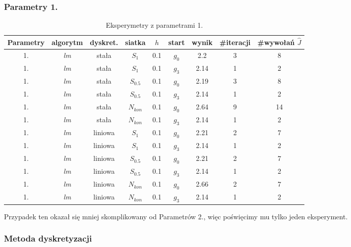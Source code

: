 \documentclass[11pt]{article}
\begin{document}
\subsubsection{Parametry 1.}
\begin{table}[h]
  \begin{center}
    \begin{tabular}{|c|c|c|c|c|c|c|c|c|}
      \hline
      Parametry & algorytm & dyskret. & siatka & $h$ & start & wynik & \#iteracji & \#wywołań $\hat{J}$ \\
      \hline
      1. & {\it lm\/} & stała & $S_1$ & 0.1 & $g_0$ & 2.2 & 3 & 8 \\
      \hline
      1. & {\it lm\/} & stała & $S_1$ & 0.1 & $g_3$ & 2.14 & 1 & 2 \\
      \hline
      1. & {\it lm\/} & stała & $S_{0.5}$ & 0.1 & $g_0$ & 2.19 & 3 & 8 \\
      \hline
      1. & {\it lm\/} & stała & $S_{0.5}$ & 0.1 & $g_3$ & 2.14 & 1 & 2 \\
      \hline
      1. & {\it lm\/} & stała & $N_{kon}$ & 0.1 & $g_0$ & 2.64 & 9 & 14 \\
      \hline
      1. & {\it lm\/} & stała & $N_{kon}$ & 0.1 & $g_3$ & 2.14 & 1 & 2 \\
      \hline
      1. & {\it lm\/} & liniowa & $S_1$ & 0.1 & $g_0$ & 2.21 & 2 & 7 \\
      \hline
      1. & {\it lm\/} & liniowa & $S_1$ & 0.1 & $g_3$ & 2.14 & 1 & 2 \\
      \hline
      1. & {\it lm\/} & liniowa & $S_{0.5}$ & 0.1 & $g_0$ & 2.21 & 2 & 7 \\
      \hline
      1. & {\it lm\/} & liniowa & $S_{0.5}$ & 0.1 & $g_3$ & 2.14 & 1 & 2 \\
      \hline
      1. & {\it lm\/} & liniowa & $N_{kon}$ & 0.1 & $g_0$ & 2.66 & 2 & 7 \\
      \hline
      1. & {\it lm\/} & liniowa & $N_{kon}$ & 0.1 & $g_3$ & 2.14 & 1 & 2 \\
      \hline
    \end{tabular}
    \caption{Eksperymetry z parametrami 1.}\label{param1_tbl}
  \end{center}
\end{table}

Przypadek ten okazał się mniej skomplikowany od Parametrów 2., więc poświęcimy mu tylko jeden eksperyment.

\subsubsection{Metoda dyskretyzacji}
\end{document}
